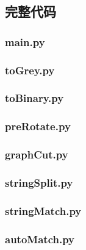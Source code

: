 \documentclass{ctexart}
\begin{document}
\subsection{完整代码}
\subsubsection{main.py}


\subsubsection{toGrey.py}


\subsubsection{toBinary.py}


\subsubsection{preRotate.py}


\subsubsection{graphCut.py}


\subsubsection{stringSplit.py}


\subsubsection{stringMatch.py}


\subsubsection{autoMatch.py}

\end{document}
